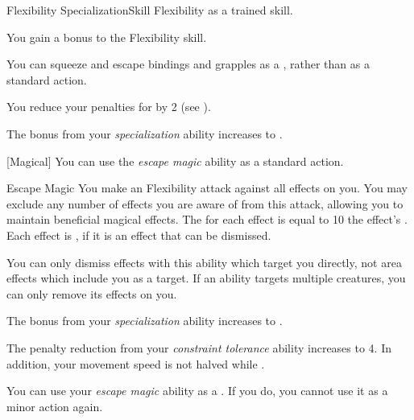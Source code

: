     \begin{feat}{Flexibility Specialization}{Skill}
        \featpre Flexibility as a trained skill.

         You gain a  bonus to the Flexibility skill.

         You can squeeze and escape bindings and grapples as a , rather than as a standard action.

         You reduce your penalties for \squeezing by 2 (see ).

         The bonus from your \textit{specialization} ability increases to .

        [Magical] You can use the \textit{escape magic} ability as a standard action.
        \begin{freeability}{Escape Magic}
            You make an Flexibility attack against all  effects on you.
            You may exclude any number of effects you are aware of from this attack, allowing you to maintain beneficial magical effects.
            The  for each effect is equal to 10 \add the effect's .
            \hit Each effect is , if it is an effect that can be dismissed.
        \end{freeability}

        You can only dismiss effects with this ability which target you directly, not area effects which include you as a target.
        If an ability targets multiple creatures, you can only remove its effects on you.

         The bonus from your \textit{specialization} ability increases to .

         The penalty reduction from your \textit{constraint tolerance} ability increases to 4.
        In addition, your movement speed is not halved while \squeezing.

         You can use your \textit{escape magic} ability as a .
        If you do, you  cannot use it as a minor action again.
    \end{feat}

